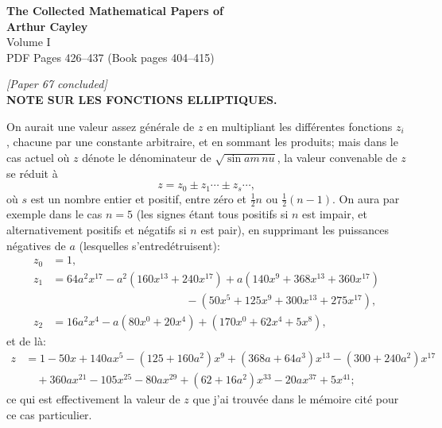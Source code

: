 \documentclass[11pt]{article}
\begin{document}
\begin{center}
{\LARGE\bfseries The Collected Mathematical Papers of}\\[0.5em]
{\LARGE\bfseries Arthur Cayley}\\[1em]
{\Large Volume I}\\[1em]
{\large PDF Pages 426--437 \quad (Book pages 404--415)}\\[2em]
\end{center}

\bigskip

\begin{center}
\textit{[Paper 67 concluded]}\\[0.5em]
\textbf{\large NOTE SUR LES FONCTIONS ELLIPTIQUES.}
\end{center}

\medskip

On aurait une valeur assez g\'en\'erale de $z$ en multipliant les diff\'erentes fonctions
$z_{i}$, chacune par une constante arbitraire, et en sommant les produits; mais dans le cas
actuel o\`u $z$ d\'enote le d\'enominateur de $\sqrt{\sin am\,nu}$, la valeur convenable de $z$ se
r\'eduit \`a
\[
z = z_{0} \pm z_{1} \cdots \pm z_{s} \cdots,
\]
o\`u $s$ est un nombre entier et positif, entre z\'ero et $\tfrac{1}{2}n$ ou $\tfrac{1}{2}(n - 1)$. On aura par
exemple dans le cas $n = 5$ (les signes \'etant tous positifs si $n$ est impair, et alternativement
positifs et n\'egatifs si $n$ est pair), en supprimant les puissances n\'egatives de $a$
(lesquelles s'entred\'etruisent):
\begin{align*}
z_{0} &= 1,\\
z_{1} &= 64a^{2}x^{17} - a^{2}(160x^{13} + 240x^{17}) + a(140x^{9} + 368x^{13} + 360x^{17})\\
&\qquad\qquad\qquad\qquad\qquad\qquad - (50x^{5} + 125x^{9} + 300x^{13} + 275x^{17}),\\
z_{2} &= 16a^{2}x^{4} - a(80x^{0} + 20x^{4}) + (170x^{0} + 62x^{4} + 5x^{8}),
\end{align*}
et de l\`a:
\begin{align*}
z &= 1 - 50x + 140ax^{5} - (125 + 160a^{2})x^{9} + (368a + 64a^{3})x^{13} - (300 + 240a^{2})x^{17}\\
&\quad + 360ax^{21} - 105x^{25} - 80ax^{29} + (62 + 16a^{2})x^{33} - 20ax^{37} + 5x^{41};
\end{align*}
ce qui est effectivement la valeur de $z$ que j'ai trouv\'ee dans le m\'emoire cit\'e pour
ce cas particulier.
\end{document}
